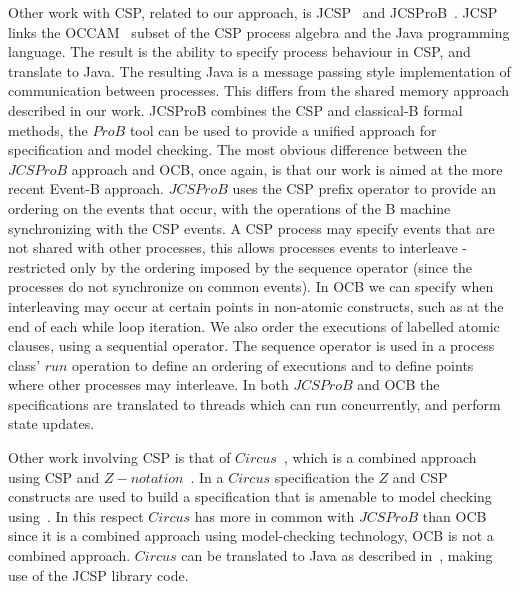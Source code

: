 Other work with CSP, related to our approach, is JCSP~\cite{JCSPMulti, JCSPNet} and JCSProB~\cite{YangPop2007}. JCSP links the OCCAM~\cite{STMoccam} subset of the CSP process algebra and the Java programming language. The result is the ability to specify process behaviour in CSP, and translate to Java. The resulting Java is a message passing style implementation of communication between processes. This differs from the shared memory approach described in our work. JCSProB combines the CSP and classical-B formal methods, the $ProB$ tool can be used to provide a unified approach for specification and model checking. The most obvious difference between the $JCSProB$ approach and OCB, once again, is that our work is aimed at the more recent Event-B approach. $JCSProB$ uses the CSP prefix operator to provide an ordering on the events that occur, with the operations of the B machine synchronizing with the CSP events. A CSP process may specify events that are not shared with other processes, this allows processes events to interleave - restricted only by the ordering imposed by the sequence operator (since the processes do not synchronize on common events). In OCB we can specify when interleaving may occur at certain points in non-atomic constructs, such as at the end of each while loop iteration. We also order the executions of labelled atomic clauses, using a sequential operator. The sequence operator is used in a process class' $run$ operation to define an ordering of executions and to define points where other processes may interleave. In both $JCSProB$ and OCB the specifications are translated to threads which can run concurrently, and perform state updates. 

Other work involving CSP is that of $Circus$~\cite{WoodcockC01}, which is a combined approach using CSP and $Z-notation$~\cite{Spivey89}. In a $Circus$ specification the $Z$ and CSP constructs are used to build a specification that is amenable to model checking using~\cite{WoodcockCF05}. In this respect $Circus$ has more in common with $JCSProB$ than OCB since it is a combined approach using model-checking technology, OCB is not a combined approach. $Circus$ can be translated to Java as described in~\cite{FreitasC06}, making use of the JCSP library code.

